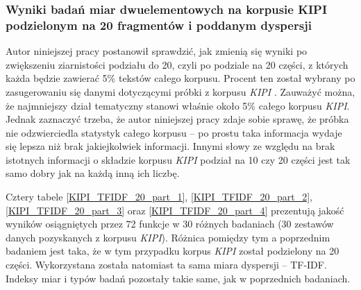 \subsubsection{Wyniki badań miar dwuelementowych na korpusie KIPI podzielonym na 20 fragmentów i poddanym dyspersji}
Autor niniejszej pracy postanowił sprawdzić, jak zmienią się wyniki po zwiększeniu ziarnistości podziału do 20, czyli po podziale na 20 części, z których każda będzie zawierać 5\% tekstów całego korpusu.
Procent ten został wybrany po zasugerowaniu się danymi dotyczącymi próbki z korpusu \emph{KIPI} \cite{korpus_ipi_pan}.
Zauważyć można, że najmniejszy dział tematyczny stanowi właśnie około 5\% całego korpusu \emph{KIPI}.
Jednak zaznaczyć trzeba, że autor niniejszej pracy zdaje sobie sprawę, że próbka nie odzwierciedla statystyk całego korpusu -- po prostu taka informacja wydaje się lepsza niż brak jakiejkolwiek informacji.
Innymi słowy ze względu na brak istotnych informacji o składzie korpusu \emph{KIPI} podział na 10 czy 20 części jest tak samo dobry jak na każdą inną ich liczbę.

\par
Cztery tabele \ref{KIPI_TFIDF_20_part_1}, \ref{KIPI_TFIDF_20_part_2}, \ref{KIPI_TFIDF_20_part_3} oraz \ref{KIPI_TFIDF_20_part_4} prezentują jakość wyników osiągniętych przez 72 funkcje w 30 różnych badaniach (30 zestawów danych pozyskanych z korpusu \emph{KIPI}).
Różnica pomiędzy tym a poprzednim badaniem jest taka, że w tym przypadku korpus \emph{KIPI} został podzielony na 20 części.
Wykorzystana została natomiast ta sama miara dyspersji -- TF-IDF.
Indeksy miar i typów badań pozostały takie same, jak w poprzednich badaniach.

